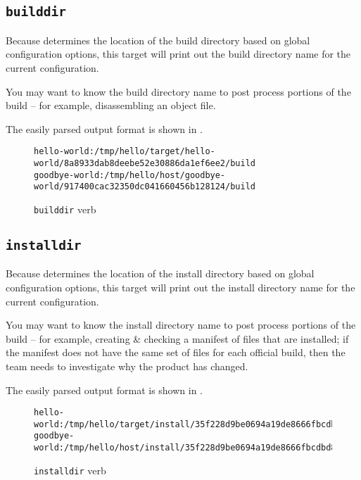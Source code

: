 \subsection{\texttt{builddir}}

Because \lmsbw determines the location of the build directory based on
global configuration options, this target will print out the build
directory name for the current configuration.

You may want to know the build directory name to post process portions
of the build -- for example, disassembling an object file.

The easily parsed output format is shown in
.

\begin{figure}[tbh]
\hrulefill
\begin{scriptsize}
\begin{verbatim}
hello-world:/tmp/hello/target/hello-world/8a8933dab8deebe52e30886da1ef6ee2/build
goodbye-world:/tmp/hello/host/goodbye-world/917400cac32350dc041660456b128124/build
\end{verbatim}
\end{scriptsize}
\hrulefill
\caption{\texttt{builddir} verb}\label{usinglmsbw:builddir-verb}
\end{figure}

\subsection{\texttt{installdir}}\label{usinglmsbw:installdir}

Because \lmsbw determines the location of the install directory based
on global configuration options, this target will print out the
install directory name for the current configuration.

You may want to know the install directory name to post process
portions of the build -- for example, creating \& checking a manifest
of files that are installed; if the manifest does not have the same
set of files for each official build, then the \bni team needs to
investigate why the product has changed.

The easily parsed output format is shown in
.

\begin{figure}[tbh]
\hrulefill
\begin{footnotesize}
\begin{verbatim}
hello-world:/tmp/hello/target/install/35f228d9be0694a19de8666fbcdbd80d
goodbye-world:/tmp/hello/host/install/35f228d9be0694a19de8666fbcdbd80d
\end{verbatim}
\end{footnotesize}
\hrulefill
\caption{\texttt{installdir} verb}\label{usinglmsbw:installdir-verb}
\end{figure}

